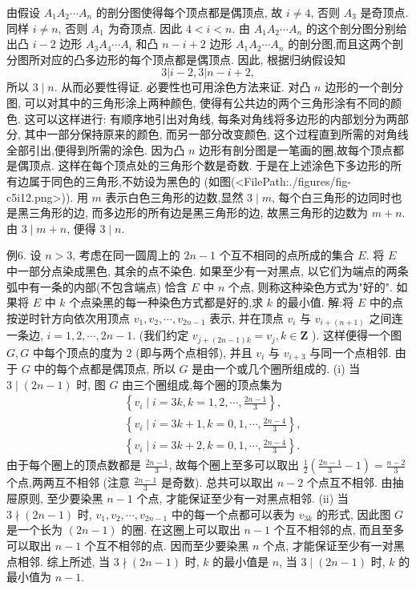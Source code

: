 由假设 $A_1 A_2 \cdots A_n$ 的剖分图使得每个顶点都是偶顶点, 故 $i \neq 4$, 否则 $A_3$ 是奇顶点.
同样 $i \neq n$, 否则 $A_1$ 为奇顶点.
因此 $4<i<n$. 由 $A_1 A_2 \cdots A_n$ 的这个剖分图分别给出凸 $i-2$ 边形 $A_3 A_4 \cdots A_i$ 和凸 $n-i+2$ 边形 $A_1 A_2 \cdots A_n$ 的剖分图,而且这两个剖分图所对应的凸多边形的每个顶点都是偶顶点.
因此, 根据归纳假设知
$$
3|i-2,3| n-i+2,
$$
所以 $3 \mid n$. 从而必要性得证.
必要性也可用涂色方法来证.
对凸 $n$ 边形的一个剖分图, 可以对其中的三角形涂上两种颜色, 使得有公共边的两个三角形涂有不同的颜色.
这可以这样进行: 有顺序地引出对角线, 每条对角线将多边形的内部划分为两部分, 其中一部分保持原来的颜色, 而另一部分改变颜色, 这个过程直到所需的对角线全部引出,便得到所需的涂色.
因为凸 $n$ 边形有剖分图是一笔画的圈,故每个顶点都是偶顶点.
这样在每个顶点处的三角形个数是奇数.
于是在上述涂色下多边形的所有边属于同色的三角形,不妨设为黑色的 (如图(<FilePath:./figures/fig-c5i12.png>)). 用 $m$ 表示白色三角形的边数,显然 $3 \mid m$, 每个白三角形的边同时也是黑三角形的边, 而多边形的所有边是黑三角形的边, 故黑三角形的边数为 $m+n$. 由 $3 \mid m+n$, 便得 $3 \mid n$.



例6. 设 $n>3$, 考虑在同一圆周上的 $2 n-1$ 个互不相同的点所成的集合 $E$. 将 $E$ 中一部分点染成黑色, 其余的点不染色.
如果至少有一对黑点, 以它们为端点的两条弧中有一条的内部(不包含端点) 恰含 $E$ 中 $n$ 个点, 则称这种染色方式为"好的". 如果将 $E$ 中 $k$ 个点染黑的每一种染色方式都是好的,求 $k$ 的最小值.
解:将 $E$ 中的点按逆时针方向依次用顶点 $v_1, v_2, \cdots, v_{2 n-1}$ 表示, 并在顶点 $v_i$ 与 $v_{i+(n+1)}$ 之间连一条边, $i=1,2, \cdots, 2 n-1$. (我们约定 $v_{j+(2 n-1) k}= v_j, k \in \mathbf{Z}$ ). 这样便得一个图 $G, G$ 中每个顶点的度为 2 (即与两个点相邻), 并且 $v_i$ 与 $v_{i+3}$ 与同一个点相邻.
由于 $G$ 中的每个点都是偶顶点, 所以 $G$ 是由一个或几个圈所组成的.
(i) 当 $3 \mid(2 n-1)$ 时, 图 $G$ 由三个圈组成,每个圈的顶点集为
$$
\begin{aligned}
& \left\{v_i \mid i=3 k, k=1,2, \cdots, \frac{2 n-1}{3}\right\}, \\
& \left\{v_i \mid i=3 k+1, k=0,1, \cdots, \frac{2 n-4}{3}\right\}, \\
& \left\{v_i \mid i=3 k+2, k=0,1, \cdots, \frac{2 n-4}{3}\right\} .
\end{aligned}
$$
由于每个圈上的顶点数都是 $\frac{2 n-1}{3}$, 故每个圈上至多可以取出 $\frac{1}{2}\left(\frac{2 n-1}{3}-1\right)=\frac{n-2}{3}$ 个点,两两互不相邻 (注意 $\frac{2 n-1}{3}$ 是奇数). 总共可以取出 $n-2$ 个点互不相邻.
由抽屉原则, 至少要染黑 $n-1$ 个点, 才能保证至少有一对黑点相邻.
(ii) 当 $3 \nmid(2 n-1)$ 时, $v_1, v_2, \cdots, v_{2 n-1}$ 中的每一个点都可以表为 $v_{3 k}$ 的形式, 因此图 $G$ 是一个长为 $(2 n-1)$ 的圈.
在这圈上可以取出 $n-1$ 个互不相邻的点, 而且至多可以取出 $n-1$ 个互不相邻的点.
因而至少要染黑 $n$ 个点, 才能保证至少有一对黑点相邻.
综上所述, 当 $3 \nmid(2 n-1)$ 时, $k$ 的最小值是 $n$, 当 $3 \mid(2 n-1)$ 时, $k$ 的最小值为 $n-1$.


